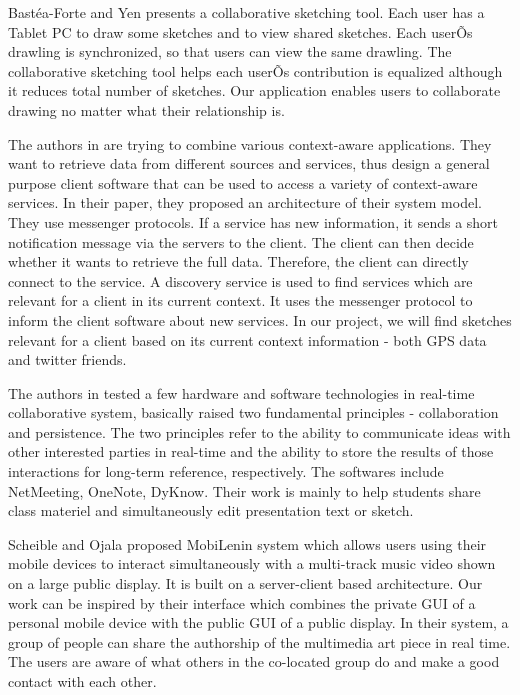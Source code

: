 \documentclass{chi2009}
\begin{document}
Bast\'{e}a-Forte and Yen \cite{brainstorming:marcello} presents a collaborative
sketching tool. Each user has a Tablet PC to draw some sketches and to view
shared sketches. Each userÕs drawling is synchronized, so that users can view
the same drawling. The collaborative sketching tool helps each userÕs
contribution is equalized although it reduces total number of sketches. Our
application enables users to collaborate drawing no matter what their
relationship is.

The authors in \cite{context:weis} are trying to combine various context-aware
applications. They want to retrieve data from different sources and services,
thus design a general purpose client software that can be used to access a
variety of context-aware services. In their paper, they proposed an
architecture of their system model. They use messenger protocols. If a service
has new information, it sends a short notification message via the servers to
the client. The client can then decide whether it wants to retrieve the full
data. Therefore, the client can directly connect to the service. A discovery
service is used to find services which are relevant for a client in its current
context. It uses the messenger protocol to inform the client software about new
services. In our project, we will find sketches relevant for a client based on
its current context information - both GPS data and twitter friends.

 The authors in \cite{ink:lindell} tested a few hardware and software
technologies in real-time collaborative system, basically raised two
fundamental principles - collaboration and persistence. The two principles
refer to the ability to communicate ideas with other interested parties in
real-time and the ability to store the results of those interactions for
long-term reference, respectively. The softwares include NetMeeting, OneNote,
DyKnow. Their work is mainly to help students share class materiel and
simultaneously edit presentation text or  sketch.

Scheible and Ojala \cite{mobilenin:scheible} proposed MobiLenin system which allows users using their mobile devices to interact simultaneously with a multi-track music video shown on a large public display. It is built on a server-client based architecture. Our work can be inspired by their interface which combines the private GUI of a personal mobile device with the public GUI of a public display. In their system, a group of people can share the authorship of the multimedia art piece in real time. The users are aware of what others in the co-located group do and make a good contact with each other.
\end{document}
